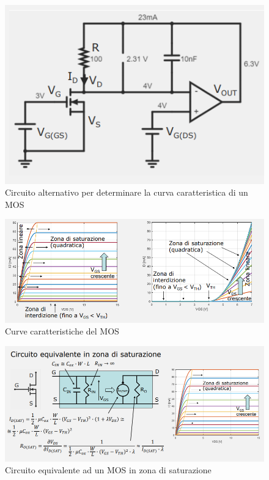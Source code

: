 \documentclass{article}
\begin{document}
\begin{figure}[h]
  \centering
  \includegraphics[scale=0.6]{IM_determinazione_MOS_bis}
  \caption{Circuito alternativo per determinare la curva caratteristica di un MOS}
  \label{Schema_determinazione_MOS_bis}
\end{figure}

\begin{figure}[h]
  \centering
  \includegraphics[scale=0.6]{IM_MOS_grafici_bis}
  \caption{Curve caratteristiche del MOS}
  \label{Schema_MOS_grafici_bis}
\end{figure}

\begin{figure}[h]
  \centering
  \includegraphics[scale=0.6]{IM_MOS_equivalente_saturazione}
  \caption{Circuito equivalente ad un MOS in zona di saturazione}
  \label{Schema_MOS_equivalente_saturazione}
\end{figure}
\end{document}
